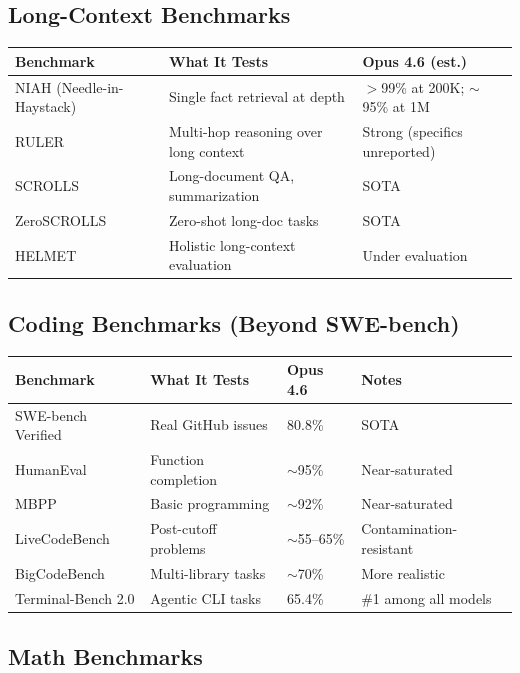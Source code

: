 \documentclass[11pt,a4paper]{article}
\begin{document}
\subsection{Long-Context Benchmarks}

\begin{center}
\begin{tabular}{lL{4cm}L{5cm}}
\toprule
\textbf{Benchmark} & \textbf{What It Tests} & \textbf{Opus 4.6 (est.)} \\
\midrule
NIAH (Needle-in-Haystack) & Single fact retrieval at depth & $>$99\% at 200K; $\sim$95\% at 1M \\
RULER & Multi-hop reasoning over long context & Strong (specifics unreported) \\
SCROLLS & Long-document QA, summarization & SOTA \\
ZeroSCROLLS & Zero-shot long-doc tasks & SOTA \\
HELMET & Holistic long-context evaluation & Under evaluation \\
\bottomrule
\end{tabular}
\end{center}

\subsection{Coding Benchmarks (Beyond SWE-bench)}

\begin{center}
\begin{tabular}{llll}
\toprule
\textbf{Benchmark} & \textbf{What It Tests} & \textbf{Opus 4.6} & \textbf{Notes} \\
\midrule
SWE-bench Verified & Real GitHub issues & 80.8\% & SOTA \\
HumanEval & Function completion & $\sim$95\% & Near-saturated \\
MBPP & Basic programming & $\sim$92\% & Near-saturated \\
LiveCodeBench & Post-cutoff problems & $\sim$55--65\% & Contamination-resistant \\
BigCodeBench & Multi-library tasks & $\sim$70\% & More realistic \\
Terminal-Bench 2.0 & Agentic CLI tasks & 65.4\% & \#1 among all models \\
\bottomrule
\end{tabular}
\end{center}

\subsection{Math Benchmarks}
\end{document}

